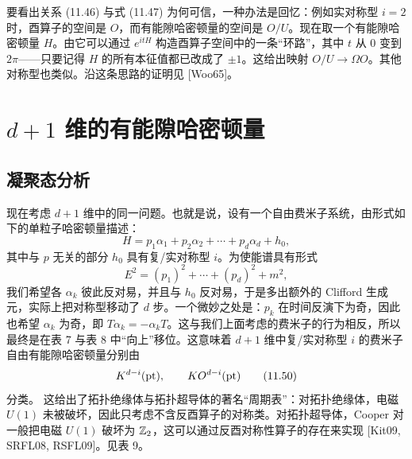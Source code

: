 要看出关系 (11.46) 与式 (11.47) 为何可信，一种办法是回忆：例如实对称型 $i=2$ 时，酉算子的空间是 $O$，而有能隙哈密顿量的空间是 $O/U$。现在取一个有能隙哈密顿量 $H$。由它可以通过 $e^{itH}$ 构造酉算子空间中的一条“环路”，其中 $t$ 从 $0$ 变到 $2\pi$——只要记得 $H$ 的所有本征值都已改成了 $\pm1$。这给出映射 $O/U\to\Omega O$。其他对称型也类似。沿这条思路的证明见 [Woo65]。


\section{$d+1$ 维的有能隙哈密顿量}

\subsection{凝聚态分析}

现在考虑 $d+1$ 维中的同一问题。也就是说，设有一个自由费米子系统，由形式如下的单粒子哈密顿量描述：
\begin{equation}
H=p_1\alpha_1+p_2\alpha_2+\cdots+p_d\alpha_d+h_0, \tag{11.48}
\end{equation}
其中与 $p$ 无关的部分 $h_0$ 具有复/实对称型 $i$。为使能谱具有形式
\begin{equation}
E^2=(p_1)^2+\cdots+(p_d)^2+m^2, \tag{11.49}
\end{equation}
我们希望各 $\alpha_k$ 彼此反对易，并且与 $h_0$ 反对易，于是多出额外的 Clifford 生成元，实际上把对称型移动了 $d$ 步。一个微妙之处是：$p_k$ 在时间反演下为奇，因此也希望 $\alpha_k$ 为奇，即 $T\alpha_k=-\alpha_kT$。这与我们上面考虑的费米子的行为相反，所以最终是在表 7 与表 8 中“向上”移位。这意味着 $d+1$ 维中复/实对称型 $i$ 的费米子自由有能隙哈密顿量分别由
\begin{equation}
K^{d-i}(\mathrm{pt}),\qquad KO^{d-i}(\mathrm{pt}) \tag{11.50}
\end{equation}
分类。
这给出了拓扑绝缘体与拓扑超导体的著名“周期表”：对拓扑绝缘体，电磁 $U(1)$ 未被破坏，因此只考虑不含反酉算子的对称类。对拓扑超导体，Cooper 对一般把电磁 $U(1)$ 破坏为 $\mathbb{Z}_2$，这可以通过反酉对称性算子的存在来实现 [Kit09, SRFL08, RSFL09]。见表 9。

